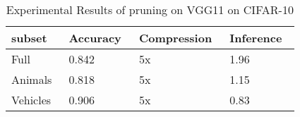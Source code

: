 \documentclass[../main]{subfiles}
\begin{document}
    \begin{table}[t]
        \centering
        \caption{Experimental Results of pruning on VGG11 on CIFAR-10}
        \begin{tabular}{|l|l|l|l|} 
            \toprule
            subset~   & Accuracy~ & Compression~ & Inference~  \\
            \midrule
            Full~     & 0.842~    & 5x~          & 1.96~       \\
            Animals~  & 0.818~    & 5x~          & 1.15~       \\
            Vehicles~ & 0.906~    & 5x~          & 0.83~       \\
            \bottomrule
        \end{tabular}
    \end{table}
\end{document}
